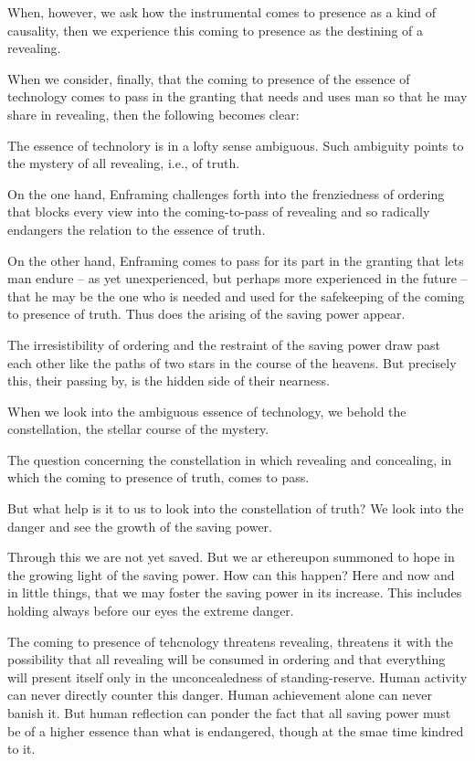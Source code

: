 When, however, we ask how the instrumental comes to presence as a kind of causality, then we experience this coming to presence as the destining of a revealing.

When we consider, finally, that the coming to presence of the essence of technology comes to pass in the granting that needs and uses man so that he may share in revealing, then the following becomes clear:

The essence of technolory is in a lofty sense ambiguous. Such ambiguity points to the mystery of all revealing, i.e., of truth.

On the one hand, Enframing challenges forth into the frenziedness of ordering that blocks every view into the coming-to-pass of revealing and so radically endangers the relation to the essence of truth.

On the other hand, Enframing comes to pass for its part in the granting that lets man endure -- as yet unexperienced, but perhaps more experienced in the future -- that he may be the one who is needed and used for the safekeeping of the coming to presence of truth. Thus does the arising of the saving power appear.

The irresistibility of ordering and the restraint of the saving power draw past each other like the paths of two stars in the course of the heavens. But precisely this, their passing by, is the hidden side of their nearness.

When we look into the ambiguous essence of technology, we behold the constellation, the stellar course of the mystery.

The question concerning the constellation in which revealing and concealing, in which the coming to presence of truth, comes to pass.

But what help is it to us to look into the constellation of truth? We look into the danger and see the growth of the saving power.

Through this we are not yet saved. But we ar ethereupon summoned to hope in the growing light of the saving power. How can this happen? Here and now and in little things, that we may foster the saving power in its increase. This includes holding always before our eyes the extreme danger.

The coming to presence of tehcnology threatens revealing, threatens it with the possibility that all revealing will be consumed in ordering and that everything will present itself only in the unconcealedness of standing-reserve. Human activity can never directly counter this danger. Human achievement alone can never banish it. But human reflection can ponder the fact that all saving power must be of a higher essence than what is endangered, though at the smae time kindred to it.

